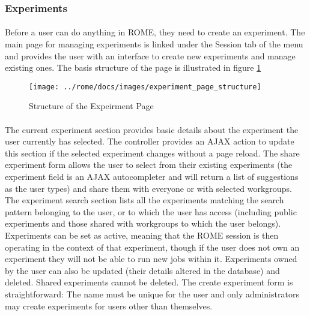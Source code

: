 \subsubsection{Experiments}
\label{sec:view_experiment}

\paragraph{}
Before a user can do anything in ROME, they need to create an experiment. The main page for managing experiments is linked under the Session tab of the menu and provides the user with an interface to create new experiments and manage existing ones. The basis structure of the page is illustrated in figure \ref{fig:experiment_page_structure}


\begin{figure}[h]
\centering
\texttt{[image: ../rome/docs/images/experiment\_page\_structure]}
\caption{Structure of the Expeirment Page}\label{fig:experiment_page_structure}
\end{figure}

\paragraph{}
The current experiment section provides basic details about the experiment the user currently has selected. The controller provides an AJAX action to update this section if the selected experiment changes without a page reload. The share experiment form allows the user to select from their existing experiments (the experiment field is an AJAX autocompleter and will return a list of suggestions as the user types) and share them with everyone or with selected workgroups. The experiment search section lists all the experiments matching the search pattern belonging to the user, or to which the user has access (including public experiments and those shared with workgroups to which the user belongs). Experiments can be set as active, meaning that the ROME session is then operating in the context of that experiment, though if the user does not own an experiment they will not be able to run new jobs within it. Experiments owned by the user can also be updated (their details altered in the database) and deleted. Shared experiments cannot be deleted. The create experiment form is straightforward: The name must be unique for the user and only administrators may create experiments for users other than themselves.